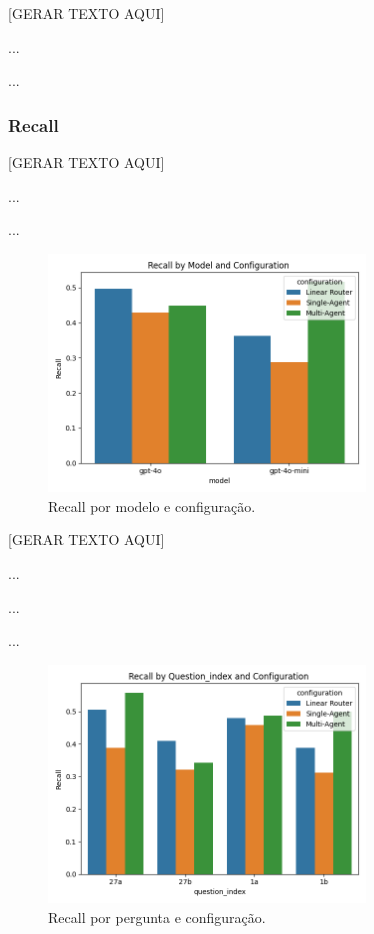                 [GERAR TEXTO AQUI]

                ...

                ...

            
            \subsubsection{Recall}
            
                [GERAR TEXTO AQUI]

                ...

                ...
                
                \begin{figure}[h!]
                    \centering              
                    \includegraphics[width=0.75\textwidth]{images_part_2/model_recall_model_configuration.png}
                    \caption{Recall por modelo e configuração.}
                    \label{fig:aaaa}
                \end{figure}

                [GERAR TEXTO AQUI]

                ...

                ...

                ...
                
                \begin{figure}[h!]
                    \centering              
                    \includegraphics[width=0.75\textwidth]{images_part_2/question_recall_question_index_configuration.png}
                    \caption{Recall por pergunta e configuração.}
                    \label{fig:aaaa}
                \end{figure}

